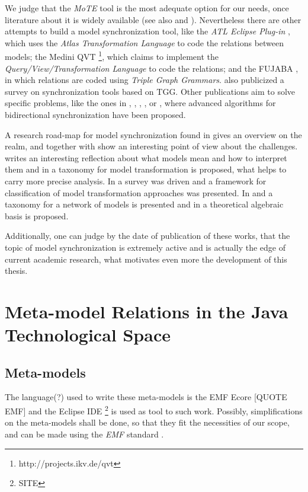 \documentclass[tuberlin,cic,tc,openright,english,noabntcite]{iiufrgs}
\begin{document}
We judge that the \emph{MoTE} tool is the most adequate option for our needs, once literature about it is widely available (see also \citep{giese2009efficient} and \citep{hildebrandt2012mdelab}). Nevertheless there are other attempts to build a model synchronization tool, like the \emph{ATL Eclipse Plug-in} \citep{jouault2008atl}, which uses the \emph{Atlas Transformation Language} to code the relations between models; the Medini QVT \footnote{http://projects.ikv.de/qvt}, which claims to implement the \emph{Query/View/Transformation Language} to code the relations; and the FUJABA \citep{nickel2000fujaba}, in which relations are coded using \emph{Triple Graph Grammars}. \citet{hildebrandt2013survey} also publicized a survey on synchronization tools based on TGG. Other publications aim to solve specific problems, like the ones in \citet{hermann2011correctness}, \citet{xiong2007towards}, \citet{giese2006incremental}, \citet{ivkovic2004tracing}, or \citet{song2011instant}, where advanced algorithms for bidirectional synchronization have been proposed.

A research road-map for model synchronization found in \citet{france2007model} gives an overview on the realm, and together with \citet{mattsson2009linking} show an interesting point of view about the challenges. \citet{seidewitz2003models} writes an interesting reflection  about what models mean and how to interpret them and in \citet{mens2006taxonomy} a taxonomy for model transformation is proposed, what helps to carry more precise analysis. In \citet{czarnecki2006feature} a survey was driven and a framework for classification of model transformation approaches was presented. In \citeauthor{diskin2014towards} \citeyearpar{diskin2014towards} and \citeyearpar{diskin2016three} a taxonomy for a network of models is presented and in \citet{diskin2011model} a theoretical algebraic basis is proposed.

Additionally, one can judge by the date of publication of these works, that the topic of model synchronization is extremely active and is actually the edge of current academic research, what motivates even more the development of this thesis.

\chapter{Meta-model Relations in the Java Technological Space}
\section{Meta-models}
The language(?) used to write these meta-models is the EMF Ecore [QUOTE EMF] and the Eclipse IDE \footnote{SITE} is used as tool to such work.
Possibly, simplifications on the meta-models shall be done, so that they fit the necessities of our scope, and can be made using the \emph{EMF} standard \cite{steinberg2008emf}.
\end{document}
